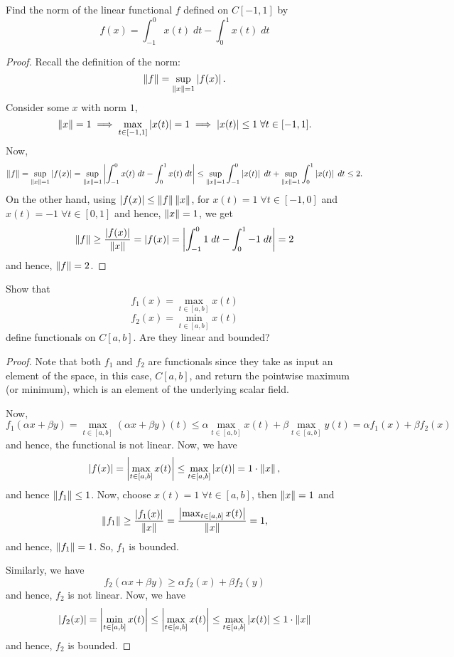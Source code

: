 \begin{question}
    Find the norm of the linear functional $f$ defined on $C[-1,1]$ by
    \[f(x) = \int_{-1}^{0} x(t) \; dt - \int_{0}^{1} x(t) \;dt \]
    \label{section2.8-3}
\end{question}
\begin{proof}
    Recall the definition of the norm:
    \[\left\lVert f \right\rVert = \sup_{\left\lVert x \right\rVert = 1} \left\lvert f(x) \right\rvert.\]
    Consider some $x$ with norm $1$, 
    \[\left\lVert x \right\rVert = 1 \implies \max_{t \in [-1,1]} \left\lvert x(t) \right\rvert = 1 \implies \left\lvert x(t) \right\rvert \leq 1 \; \forall t \in [-1,1].\]
    Now,
    \[\left\lVert f \right\rVert = \sup_{\left\lVert x \right\rVert = 1} \left\lvert f(x) \right\rvert = \sup_{\left\lVert x \right\rVert = 1} \left\lvert \int_{-1}^{0} x(t) \; dt - \int_{0}^{1} x(t) \; dt \right\rvert \leq \sup_{\left\lVert x \right\rVert = 1} \int_{-1}^{0} \left\lvert x(t) \right\rvert \; dt + \sup_{\left\lVert x \right\rVert = 1} \int_{0}^{1} \left\lvert x(t) \right\rvert \; dt \leq 2.\]
    On the other hand, using $\left\lvert f(x) \right\rvert \leq \left\lVert f \right\rVert \left\lVert x \right\rVert$, for $x(t) = 1 \; \forall t \in [-1,0]$ and $x(t) = -1 \;\forall t \in [0,1]$ and hence, $\left\lVert x \right\rVert = 1$, we get
    \[\left\lVert f \right\rVert \geq \frac{\left\lvert f(x) \right\rvert}{\left\lVert x \right\rVert} = \left\lvert f(x) \right\rvert = \left\lvert \int_{-1}^{0} 1 \;dt - \int_{0}^{1} -1 \; dt \right\rvert = 2\]
    and hence, $\left\lVert f \right\rVert = 2$.
\end{proof}

\begin{question}
    Show that 
    \[f_1(x) = \max_{t \in [a,b]} x(t)\]
    \[f_2(x) = \min_{t \in [a,b]} x(t)\]
    define functionals on $C[a,b]$. Are they linear and bounded?
    \label{section2.8-4}
\end{question}
\begin{proof}
    Note that both $f_1$ and $f_2$ are functionals since they take as input an element of the space, in this case, $C[a,b]$, and return the pointwise maximum (or minimum), which is an element of the underlying scalar field.

    Now, 
    \[f_1(\alpha x + \beta y) = \max_{t \in [a,b]} (\alpha x + \beta y)(t) \leq \alpha \max_{t \in [a,b]} x(t) + \beta \max_{t \in [a,b]} y(t) = \alpha f_1(x) + \beta f_2(x)\]
     and hence, the functional is not linear. Now, we have
     \[\left\lvert f(x) \right\rvert = \left\lvert \max_{t \in [a,b]} x(t) \right\rvert \leq \max_{t \in [a,b]} \left\lvert x(t) \right\rvert = 1 \cdot \left\lVert x \right\rVert, \]
     and hence $\left\lVert f_1 \right\rVert \leq 1$. Now, choose $x(t) = 1 \;\forall t\in [a,b]$, then $\left\lVert x \right\rVert = 1$ and 
     \[\left\lVert f_1 \right\rVert \geq \frac{\left\lvert f_1(x) \right\rvert}{\left\lVert x \right\rVert} = \frac{\left\lvert \max_{t \in [a,b]}x(t) \right\rvert} {\left\lVert x \right\rVert} = 1,\]
     and hence, $\left\lVert f_1 \right\rVert = 1$. So, $f_1$ is bounded. 

     Similarly, we have
     \[f_2(\alpha x + \beta y) \geq \alpha f_2(x) + \beta f_2(y)\]
      and hence, $f_2$ is not linear. Now, we have
      \[\left\lvert f_2(x) \right\rvert = \left\lvert \min_{t \in [a,b]} x(t) \right\rvert \leq \left\lvert \max_{t \in [a,b]} x(t) \right\rvert \leq \max_{t \in [a,b]} \left\lvert x(t) \right\rvert \leq 1 \cdot \left\lVert x \right\rVert \]
      and hence, $f_2$ is bounded.
\end{proof}

